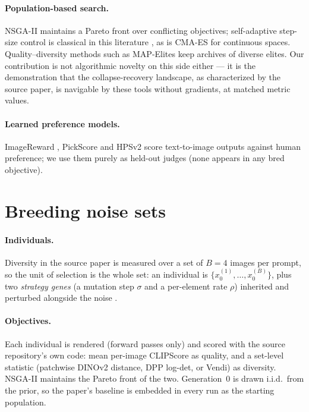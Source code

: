 \documentclass[10pt,twocolumn,letterpaper]{article}
\begin{document}
\paragraph{Population-based search.} NSGA-II \cite{deb2002nsga2} maintains a
Pareto front over conflicting objectives; self-adaptive step-size control is
classical in this literature \cite{beyer2002es}, as is CMA-ES
\cite{hansen2001cma} for continuous spaces. Quality--diversity methods such as
MAP-Elites \cite{mouret2015illuminating} keep archives of diverse elites. Our
contribution is not algorithmic novelty on this side either --- it is the
demonstration that the collapse-recovery landscape, as characterized by the
source paper, is navigable by these tools without gradients, at matched
metric values.

\paragraph{Learned preference models.} ImageReward \cite{xu2023imagereward},
PickScore \cite{kirstain2023pickapic} and HPSv2 \cite{wu2023hps} score
text-to-image outputs against human preference; we use them purely as
held-out judges (none appears in any bred objective).

\section{Breeding noise sets}
\label{sec:method}

\paragraph{Individuals.} Diversity in the source paper is measured over a set
of $B{=}4$ images per prompt, so the unit of selection is the whole set: an
individual is $\{x_0^{(1)},\dots,x_0^{(B)}\}$, plus two \emph{strategy genes}
(a mutation step $\sigma$ and a per-element rate $\rho$) inherited and
perturbed alongside the noise \cite{beyer2002es}.

\paragraph{Objectives.} Each individual is rendered (forward passes only) and
scored with the source repository's own code: mean per-image CLIPScore as
quality, and a set-level statistic (patchwise DINOv2 distance, DPP log-det,
or Vendi) as diversity. NSGA-II maintains the Pareto front of the two.
Generation~0 is drawn i.i.d.\ from the prior, so the paper's baseline is
embedded in every run as the starting population.
\end{document}
